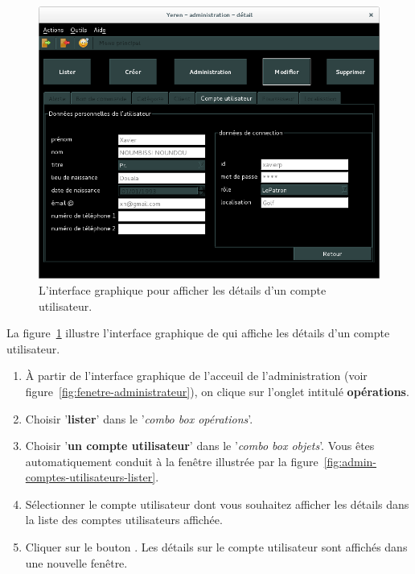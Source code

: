 

\begin{figure}[!htpb]
	\centering
	\includegraphics[scale=0.45]{images/compte-utilisateur-afficher-details.png}
	\caption{L'interface graphique pour afficher les d\'etails
			d'un compte utilisateur.}
	\label{fig:admin-comptes-utilisateurs-afficher-details}
\end{figure}

La figure~\ref{fig:admin-comptes-utilisateurs-afficher-details}
illustre l'interface graphique de \yeroth qui affiche les
d\'etails d'un compte utilisateur.

\begin{enumerate}[1)]
	\item \`A partir de l'interface graphique de l'acceuil de
		l'administration (voir figure~\ref{fig:fenetre-administrateur}),
		on clique sur l'onglet intitul\'e \textbf{op\'erations}. 
		
	\item Choisir '\textbf{lister}' dans le '\emph{combo box
		op\'erations}'.
		
	\item Choisir '\textbf{un compte utilisateur}' dans le
		'\emph{combo box objets}'. Vous \^etes automatiquement
		conduit \`a la fen\^etre illustr\'ee par la
		figure~\ref{fig:admin-comptes-utilisateurs-lister}.
		
	\item S\'electionner le compte utilisateur dont vous
		souhaitez afficher les d\'etails dans la liste des
		comptes utilisateurs affich\'ee.
		
	\item Cliquer sur le bouton . Les d\'etails
		sur le compte utilisateur sont affich\'es dans
		une nouvelle fen\^etre.
\end{enumerate}


